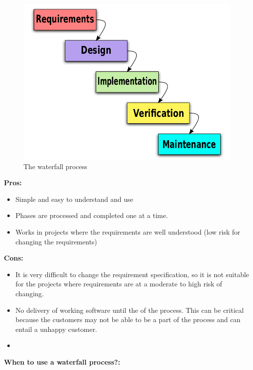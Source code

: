 \begin{figure}[ht!]
\centering
\includegraphics[scale=0.3]{pictures/Waterfall_model.png}
\caption{The waterfall process}
\label{overflow}
\end{figure}

{\bf Pros: }
\begin{itemize}
	\item Simple and easy to understand and use
	\item Phases are processed and completed one at a time.
	\item Works in projects where the requirements are well understood (low risk for changing the requirements)
\end{itemize}

{\bf Cons: }
\begin{itemize}
	\item It is very difficult to change the requirement specification, so it is not suitable for the projects where requirements are at a moderate to high risk of changing.
	\item No delivery of working software until the of the process. This can be critical because the customers may not
	be able to be a part of the process and can entail a unhappy customer.
	\item 
\end{itemize}

{\bf When to use a waterfall process?: }




